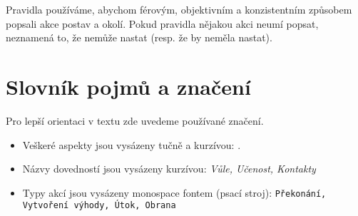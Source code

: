 \documentclass[../main.tex]{subfiles}
\begin{document}
Pravidla používáme, abychom férovým, objektivním a konzistentním způsobem popsali akce postav a okolí. Pokud pravidla nějakou akci neumí popsat, neznamená to, že nemůže nastat (resp. že by neměla nastat).

\section{Slovník pojmů a značení}
\label{sec:slovnik}
Pro lepší orientaci v textu zde uvedeme používané značení.

\begin{itemize}
\item Veškeré aspekty jsou vysázeny tučně a kurzívou: .
\item Názvy dovedností jsou vysázeny kurzívou: \textit{Vůle, Učenost, Kontakty}
\item Typy akcí jsou vysázeny monospace fontem (psací stroj): \texttt{Překonání, Vytvoření výhody, Útok, Obrana}
\end{itemize}
\end{document}
